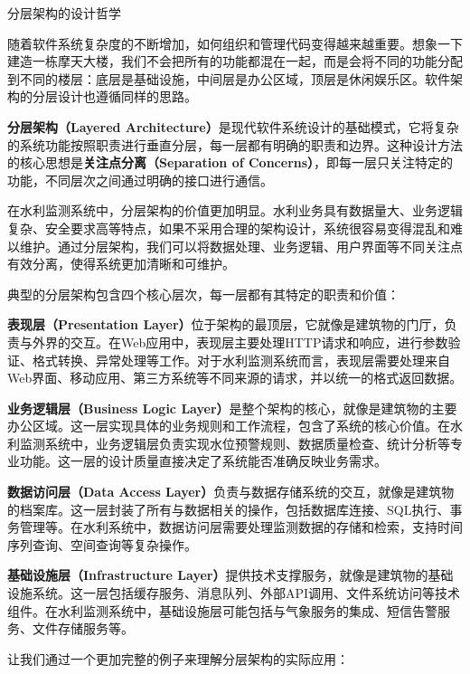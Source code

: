  分层架构的设计哲学

随着软件系统复杂度的不断增加，如何组织和管理代码变得越来越重要。想象一下建造一栋摩天大楼，我们不会把所有的功能都混在一起，而是会将不同的功能分配到不同的楼层：底层是基础设施，中间层是办公区域，顶层是休闲娱乐区。软件架构的分层设计也遵循同样的思路。

\textbf{分层架构（Layered Architecture）}是现代软件系统设计的基础模式，它将复杂的系统功能按照职责进行垂直分层，每一层都有明确的职责和边界。这种设计方法的核心思想是\textbf{关注点分离（Separation of Concerns）}，即每一层只关注特定的功能，不同层次之间通过明确的接口进行通信。

在水利监测系统中，分层架构的价值更加明显。水利业务具有数据量大、业务逻辑复杂、安全要求高等特点，如果不采用合理的架构设计，系统很容易变得混乱和难以维护。通过分层架构，我们可以将数据处理、业务逻辑、用户界面等不同关注点有效分离，使得系统更加清晰和可维护。

典型的分层架构包含四个核心层次，每一层都有其特定的职责和价值：

\textbf{表现层（Presentation Layer）}位于架构的最顶层，它就像是建筑物的门厅，负责与外界的交互。在Web应用中，表现层主要处理HTTP请求和响应，进行参数验证、格式转换、异常处理等工作。对于水利监测系统而言，表现层需要处理来自Web界面、移动应用、第三方系统等不同来源的请求，并以统一的格式返回数据。

\textbf{业务逻辑层（Business Logic Layer）}是整个架构的核心，就像是建筑物的主要办公区域。这一层实现具体的业务规则和工作流程，包含了系统的核心价值。在水利监测系统中，业务逻辑层负责实现水位预警规则、数据质量检查、统计分析等专业功能。这一层的设计质量直接决定了系统能否准确反映业务需求。

\textbf{数据访问层（Data Access Layer）}负责与数据存储系统的交互，就像是建筑物的档案库。这一层封装了所有与数据相关的操作，包括数据库连接、SQL执行、事务管理等。在水利系统中，数据访问层需要处理监测数据的存储和检索，支持时间序列查询、空间查询等复杂操作。

\textbf{基础设施层（Infrastructure Layer）}提供技术支撑服务，就像是建筑物的基础设施系统。这一层包括缓存服务、消息队列、外部API调用、文件系统访问等技术组件。在水利监测系统中，基础设施层可能包括与气象服务的集成、短信告警服务、文件存储服务等。

让我们通过一个更加完整的例子来理解分层架构的实际应用：

